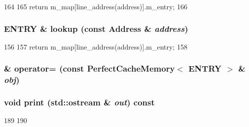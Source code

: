 \begin{DoxyCode}
164 {
165     return m_map[line_address(address)].m_entry;
166 }
\end{DoxyCode}
\hypertarget{classPerfectCacheMemory_abd0da9aa91ec16001a743cdfd88435c2}{
\subsubsection[{lookup}]{\setlength{\rightskip}{0pt plus 5cm}ENTRY \& lookup (const {\bf Address} \& {\em address})}}
\label{classPerfectCacheMemory_abd0da9aa91ec16001a743cdfd88435c2}



\begin{DoxyCode}
156 {
157     return m_map[line_address(address)].m_entry;
158 }
\end{DoxyCode}
\hypertarget{classPerfectCacheMemory_af0ee374fdedca801f79f2dc482ad0e62}{
\subsubsection[{operator=}]{\& operator= (const {\bf PerfectCacheMemory}$<$ ENTRY $>$ \& {\em obj})}}
\label{classPerfectCacheMemory_af0ee374fdedca801f79f2dc482ad0e62}
\hypertarget{classPerfectCacheMemory_ac55fe386a101fbae38c716067c9966a0}{
\subsubsection[{print}]{\setlength{\rightskip}{0pt plus 5cm}void print (std::ostream \& {\em out}) const}}
\label{classPerfectCacheMemory_ac55fe386a101fbae38c716067c9966a0}



\begin{DoxyCode}
189 {
190 }
\end{DoxyCode}


